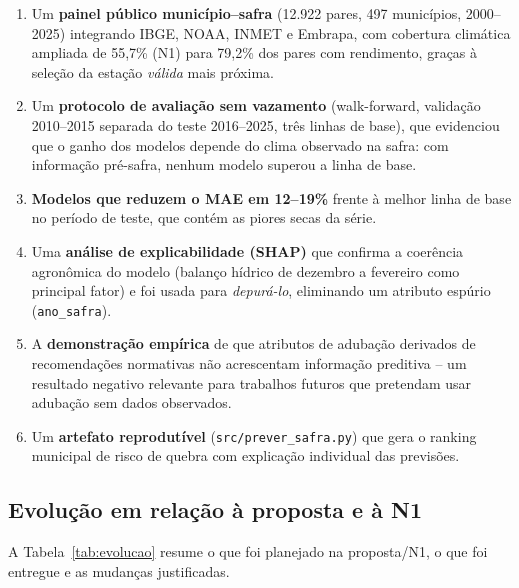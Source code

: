 \documentclass[12pt]{article}
\begin{document}
\begin{enumerate}
  \item Um \textbf{painel público município--safra} (12.922 pares, 497
    municípios, 2000--2025) integrando IBGE, NOAA, INMET e Embrapa, com
    cobertura climática ampliada de 55,7\% (N1) para 79,2\% dos pares com
    rendimento, graças à seleção da estação \emph{válida} mais próxima.
  \item Um \textbf{protocolo de avaliação sem vazamento} (walk-forward,
    validação 2010--2015 separada do teste 2016--2025, três linhas de base),
    que evidenciou que o ganho dos modelos depende do clima observado na
    safra: com informação pré-safra, nenhum modelo superou a linha de base.
  \item \textbf{Modelos que reduzem o MAE em 12--19\%} frente à melhor linha
    de base no período de teste, que contém as piores secas da série.
  \item Uma \textbf{análise de explicabilidade (SHAP)} que confirma a
    coerência agronômica do modelo (balanço hídrico de dezembro a fevereiro
    como principal fator) e foi usada para \emph{depurá-lo}, eliminando um
    atributo espúrio (\texttt{ano\_safra}).
  \item A \textbf{demonstração empírica} de que atributos de adubação
    derivados de recomendações normativas não acrescentam informação
    preditiva -- um resultado negativo relevante para trabalhos futuros que
    pretendam usar adubação sem dados observados.
  \item Um \textbf{artefato reprodutível} (\texttt{src/prever\_safra.py})
    que gera o ranking municipal de risco de quebra com explicação
    individual das previsões.
\end{enumerate}

\subsection{Evolução em relação à proposta e à N1}

A Tabela~\ref{tab:evolucao} resume o que foi planejado na proposta/N1, o
que foi entregue e as mudanças justificadas.
\end{document}
